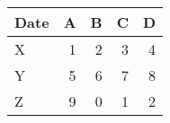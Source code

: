 \begin{tabular}{lrrrr}
\toprule
Date &  A &  B &  C &  D \\
\midrule
   X &  1 &  2 &  3 &  4 \\
   Y &  5 &  6 &  7 &  8 \\
   Z &  9 &  0 &  1 &  2 \\
\bottomrule
\end{tabular}
